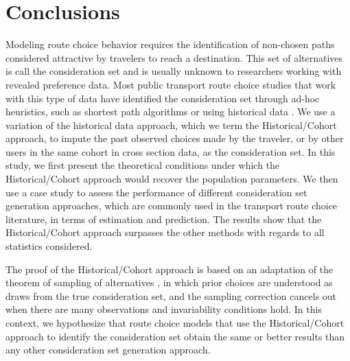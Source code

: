 \documentclass[12pt,a4paper]{article}
\begin{document}
\section{Conclusions}

Modeling route choice behavior requires the identification of non-chosen paths considered attractive by travelers to reach a destination. This set of alternatives is call the consideration set and is usually unknown to researchers working with revealed preference data. Most public transport route choice studies that work with this type of data have identified the consideration set through ad-hoc heuristics, such as shortest path algorithms \citep{rui2016modeling} or using historical data \citep{janovsikova2014estimation, kim2019calibration}. We use a variation of the historical data approach, which we term the Historical/Cohort approach, to impute the past observed choices made by the traveler, or by other users in the same cohort in cross section data, as the consideration set. In this study, we first present the theoretical conditions under which the Historical/Cohort approach would recover the population parameters. We then use a case study to assess the performance of different consideration set generation approaches, which are commonly used in the transport route choice literature, in terms of estimation and prediction. The results show that the Historical/Cohort approach surpasses the other methods with regards to all statistics considered.

The proof of the Historical/Cohort approach is based on an adaptation of the theorem of sampling of alternatives \citep{mcfadden1978}, in which prior choices are understood as draws from the true consideration set, and the sampling correction cancels out when there are many observations and invariability conditions hold. In this context, we hypothesize that route choice models that use the Historical/Cohort approach to identify the consideration set obtain the same or better results than any other consideration set generation approach. 
\end{document}
